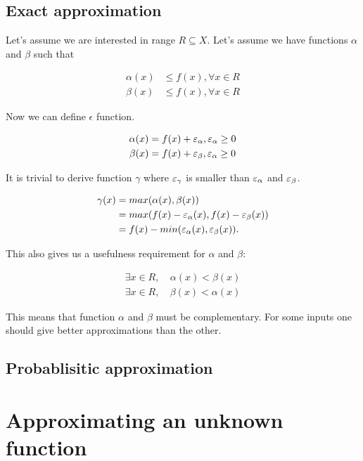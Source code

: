 \documentclass [12pt]{article} %
\begin{document}
\subsection{Exact approximation}

Let's assume we are interested in range $R \subseteq X$. Let's assume we 
have functions $\alpha$ and $\beta$ such that

\begin{align*}
    \alpha(x) &\leq f(x), \forall x \in R \\
    \beta(x)  &\leq f(x), \forall x \in R 
\end{align*}

Now we can define $\epsilon$ function.

\begin{align*}
    \alpha(x) &= f(x) + \varepsilon_{\alpha}, \varepsilon_{\alpha} \geq 0 \\
    \beta(x)  &= f(x) + \varepsilon_{\beta}, \varepsilon_{\alpha} \geq 0
\end{align*}

It is trivial to derive function $\gamma$ where $\varepsilon_{\gamma}$ is smaller 
than $\varepsilon_{\alpha}$ and $\varepsilon_{\beta}$.

\begin{align*}
    \gamma(x)   &= max(\alpha(x), \beta(x)) \\
                &= max(f(x) - \varepsilon_{\alpha}(x), f(x) - \varepsilon_{\beta}(x)) \\
                &= f(x) - min(\varepsilon_{\alpha}(x), \varepsilon_{\beta}(x)).
\end{align*}

This also gives us a usefulness requirement for $\alpha$ and $\beta$:

\begin{align*}
    \exists x \in R, ~ &\alpha(x) < \beta(x) \\
    \exists x \in R, ~ &\beta(x) < \alpha(x)
\end{align*}

This means that function $\alpha$ and $\beta$ must be complementary.
For some inputs one should give better approximations than the other.

\subsection{Probablisitic approximation}

\section{Approximating an unknown function}
\end{document}
